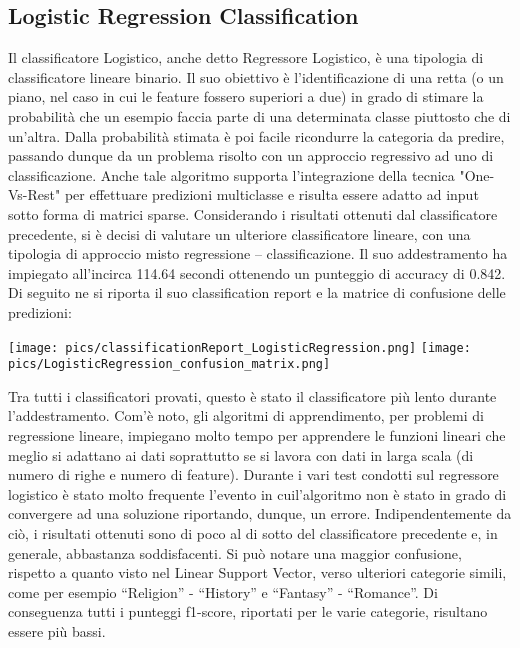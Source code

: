 \documentclass[12pt,oneside]{article}
\begin{document}
    \begin{enumerate}
    
    \subsection{Logistic Regression Classification}
    \begin{justify}
    Il classificatore Logistico, anche detto Regressore Logistico, è una tipologia di classificatore lineare binario. Il suo obiettivo è l’identificazione di una retta (o un piano, nel caso in cui le feature fossero superiori a due) in grado di stimare la probabilità che un esempio faccia parte di una determinata classe piuttosto che di un’altra. Dalla probabilità stimata è poi facile ricondurre la categoria da predire, passando dunque da un problema risolto con un approccio regressivo ad uno di classificazione. Anche tale algoritmo supporta l’integrazione della tecnica "One-Vs-Rest" per effettuare predizioni multiclasse e risulta essere adatto ad input sotto forma di matrici sparse. Considerando i risultati ottenuti dal classificatore precedente, si è decisi di valutare un ulteriore classificatore lineare, con una tipologia di approccio misto regressione – classificazione.
    Il suo addestramento ha impiegato all’incirca 114.64 secondi ottenendo un punteggio di accuracy di 0.842. 
    Di seguito ne si riporta il suo classification report e la matrice di confusione delle predizioni:
    \end{justify}

    \texttt{[image: pics/classificationReport\_LogisticRegression.png]}
    \texttt{[image: pics/LogisticRegression\_confusion\_matrix.png]}

    \begin{justify}
    Tra tutti i classificatori provati, questo è stato il classificatore più lento durante l’addestramento. Com’è noto, gli algoritmi di apprendimento, per problemi di regressione lineare, impiegano molto tempo per apprendere le funzioni lineari che meglio si adattano ai dati soprattutto se si lavora con dati in larga scala (di numero di righe e numero di feature). Durante i vari test condotti sul regressore logistico è stato molto frequente l'evento in cuil’algoritmo non è stato in grado di convergere ad una soluzione riportando, dunque, un errore. Indipendentemente da ciò, i risultati ottenuti sono di poco al di sotto del classificatore precedente e, in generale, abbastanza soddisfacenti. Si può notare una maggior confusione, rispetto a quanto visto nel Linear Support Vector, verso ulteriori categorie simili, come per esempio “Religion” - “History” e “Fantasy” - “Romance”. Di conseguenza tutti i punteggi f1-score, riportati per le varie categorie, risultano essere più bassi. 
    \end{justify}
    \end{enumerate}
\end{document}

